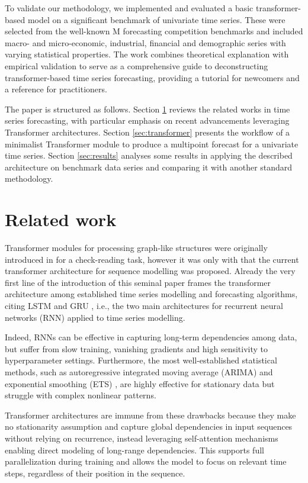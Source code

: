 \documentclass[algorithms,article,submit,pdftex,moreauthors]{Definitions/mdpi}
\begin{document}
To validate our methodology, we implemented and evaluated a basic transformer-based model on a significant benchmark of univariate time series. These were selected from the well-known M forecasting competition benchmarks and included macro- and micro-economic, industrial, financial and demographic series with varying statistical properties. The work combines theoretical explanation with empirical validation to serve as a comprehensive guide to deconstructing transformer-based time series forecasting, providing a tutorial for newcomers and a reference for practitioners.

The paper is structured as follows. Section \ref{sec:literature} reviews the related works in time series forecasting, with particular emphasis on recent advancements leveraging Transformer architectures. Section \ref{sec:transformer} presents the workflow of a minimalist Transformer module to produce a multipoint forecast for a univariate time series. Section \ref{sec:results} analyses some results in applying the described architecture on benchmark data series and comparing it with another standard methodology.

\section{Related work} \label{sec:literature}

Transformer modules for processing graph-like structures were originally introduced in \citep{LBB97} for a check-reading task, however it was only with \citep{VSPU17} that the current transformer architecture for sequence modelling was proposed. Already the very first line of the introduction of this seminal paper frames the transformer architecture among established time series modelling and forecasting algorithms, citing LSTM \citep{HS97} and GRU \citep{ CGCB14}, i.e., the two main architectures for recurrent neural networks (RNN) applied to time series modelling.

Indeed, RNNs can be effective in capturing long-term dependencies among data, but suffer from slow training, vanishing gradients and high sensitivity to hyperparameter settings. Furthermore, the most well-established statistical methods, such as autoregressive integrated moving average (ARIMA) \citep{BJ70} and exponential smoothing (ETS) \citep{H57,W60}, are highly effective for stationary data but struggle with complex nonlinear patterns.

Transformer architectures are immune from these drawbacks because they make no stationarity assumption and capture global dependencies in input sequences without relying on recurrence, instead leveraging self-attention mechanisms enabling direct modeling of long-range dependencies. This supports full parallelization during training and allows the model to focus on relevant time steps, regardless of their position in the sequence.
\end{document}

